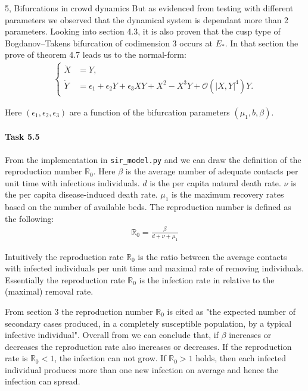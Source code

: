 \begin{task}{5, Bifurcations in crowd dynamics}
But as evidenced from testing with different parameters we observed that the dynamical system is dependant more than 2 parameters. Looking into \cite{shan2014bifurcations} section 4.3, it is also proven that the cusp type of Bogdanov–Takens bifurcation of codimension 3 occurs at $E_*$. In that section the prove of \cite{shan2014bifurcations} theorem 4.7 leads us to the normal-form:
\begin{align*}
    \begin{cases}
        \dot{X} &= Y,\\
        \dot{Y} &= \epsilon_1 + \epsilon_2 Y+\epsilon_3 XY+X^2 -X^3 Y+\mathcal{O}(|X,Y|^4)Y.
    \end{cases}
\end{align*}

Here $(\epsilon_1, \epsilon_2, \epsilon_3)$ are a function of the bifurcation parameters $(\mu_1, b, \beta)$.

\paragraph{Task 5.5}
From the implementation in \verb|sir_model.py| and \cite{shan2014bifurcations} we can draw the definition of the reproduction number $\mathbb{R}_0$. Here $\beta$ is the average number of adequate contacts per unit time with infectious individuals. $d$ is the per capita natural death rate. $\nu$ is the per capita disease-induced death rate. $\mu_1$ is the maximum recovery rates based on the number of available beds. The reproduction number is defined as the following:
\begin{align*}
    \mathbb{R}_0 = \frac{\beta}{d+\nu +\mu_1}
\end{align*}

Intuitively the reproduction rate $\mathbb{R}_0$ is the ratio between the average contacts with infected individuals per unit time and maximal rate of removing individuals. Essentially the reproduction rate $\mathbb{R}_0$ is the infection rate in relative to the (maximal) removal rate.

From \cite{van2002reproduction} section 3 the reproduction number $\mathbb{R}_0$ is cited as "the expected number of secondary cases produced, in a completely susceptible population, by a typical infective individual". Overall from \cite{van2002reproduction} we can conclude that, if $\beta$ increases or decreases the reproduction rate also increases or decreases. If the reproduction rate is $\mathbb{R}_0<1$, the infection can not grow. If $\mathbb{R}_0>1$ holds, then each infected individual produces more than one new infection on average and hence the infection can spread.


\end{task}
